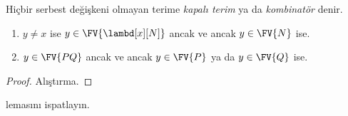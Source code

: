 \begin{defn}
  Hiçbir serbest değişkeni olmayan terime \emph{kapalı terim} ya da
  \emph{kombinatör} denir.
\end{defn}

\begin{lem}
  \begin{enumerate}
    \item {} $y \neq x$ ise $y \in
      \FV{\lambd[x][N]}$ ancak ve ancak $y \in \FV{N}$ ise.
    \item {} $y \in \FV{PQ}$ ancak ve ancak
      $y \in \FV{P}$ ya da $y \in \FV{Q}$ ise.
    \end{enumerate}
\end{lem}

\begin{proof}
  Alıştırma.
\end{proof}

\begin{prob}
   lemasını ispatlayın.
\end{prob}

